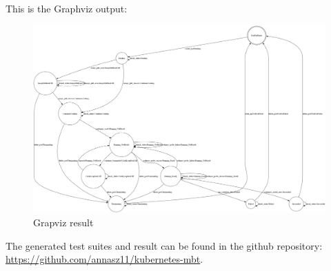 \documentclass[main.tex]{subfiles}
\begin{document}
This is the Graphviz output:
\begin{figure}[H]
    \centering
    \includegraphics[width=\textwidth]{test_results/tt_image.png}
    \caption{Grapviz result}
    \label{fig:grapviz}

\end{figure}


The generated test suites and result can be found in the github repository: \url{https://github.com/annasz11/kubernetes-mbt}.
\end{document}

